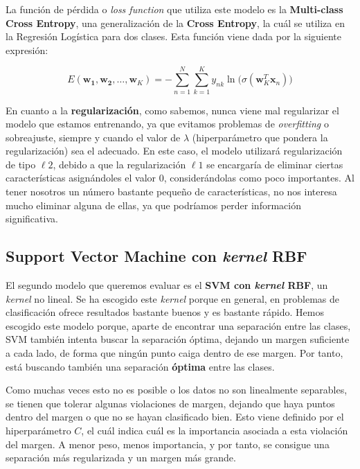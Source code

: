 \documentclass[11pt,a4paper]{article}
\begin{document}
La función de pérdida o \textit{loss function} que utiliza este modelo es la \textbf{Multi-class Cross Entropy}, una generalización de la
\textbf{Cross Entropy}, la cuál se utiliza en la Regresión Logística para dos clases. Esta función viene dada por la siguiente expresión:

\begin{equation}
\label{eq:mult-cross-entropy}
E(\mathbf{w_1}, \mathbf{w_2}, \dots, \mathbf{w}_K) = -\sum_{n=1}^N \sum_{k=1}^{K} y_{nk} \ln \Big(\sigma (\mathbf{w}_K^T \mathbf{x}_n)\Big)
\end{equation}

En cuanto a la \textbf{regularización}, como sabemos, nunca viene mal regularizar el modelo que estamos entrenando, ya que evitamos problemas de
\textit{overfitting} o sobreajuste, siempre y cuando el valor de $\lambda$ (hiperparámetro que pondera la regularización) sea el adecuado. 
En este caso, el modelo utilizará regularización de tipo $\ell 2$, debido a que la regularización $\ell 1$ se encargaría de eliminar ciertas
características asignándoles el valor 0, considerándolas como poco importantes. Al tener nosotros un número bastante pequeño de
características, no nos interesa mucho eliminar alguna de ellas, ya que podríamos perder información significativa.

\subsection{Support Vector Machine con \textit{kernel} RBF}

El segundo modelo que queremos evaluar es el \textbf{SVM con \textit{kernel} RBF}, un \textit{kernel} no lineal. Se ha escogido este \textit{kernel}
porque en general, en problemas de clasificación ofrece resultados bastante buenos y es bastante rápido. Hemos escogido este modelo porque,
aparte de encontrar una separación entre las clases, SVM también intenta buscar la separación óptima, dejando un margen suficiente a cada
lado, de forma que ningún punto caiga dentro de ese margen. Por tanto, está buscando también una separación \textbf{óptima} entre las clases.

Como muchas veces esto no es posible o los datos no son linealmente separables, se tienen que tolerar algunas violaciones de margen, dejando
que haya puntos dentro del margen o que no se hayan clasificado bien. Esto viene definido por el hiperparámetro $C$, el cuál indica cuál
es la importancia asociada a esta violación del margen. A menor peso, menos importancia, y por tanto, se consigue una separación más
regularizada y un margen más grande.
\end{document}

